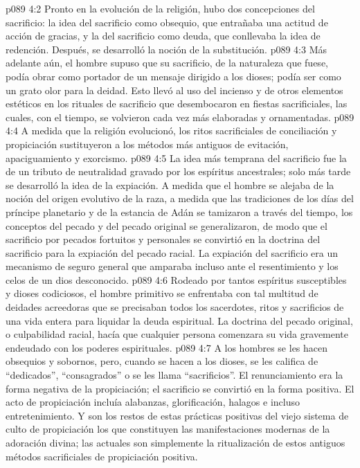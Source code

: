 \vs p089 4:2 Pronto en la evolución de la religión, hubo dos concepciones del sacrificio: la idea del sacrificio como obsequio, que entrañaba una actitud de acción de gracias, y la del sacrificio como deuda, que conllevaba la idea de redención. Después, se desarrolló la noción de la substitución.
\vs p089 4:3 Más adelante aún, el hombre supuso que su sacrificio, de la naturaleza que fuese, podía obrar como portador de un mensaje dirigido a los dioses; podía ser como un grato olor para la deidad. Esto llevó al uso del incienso y de otros elementos estéticos en los rituales de sacrificio que desembocaron en fiestas sacrificiales, las cuales, con el tiempo, se volvieron cada vez más elaboradas y ornamentadas.
\vs p089 4:4 \pc A medida que la religión evolucionó, los ritos sacrificiales de conciliación y propiciación sustituyeron a los métodos más antiguos de evitación, apaciguamiento y exorcismo.
\vs p089 4:5 La idea más temprana del sacrificio fue la de un tributo de neutralidad gravado por los espíritus ancestrales; solo más tarde se desarrolló la idea de la expiación. A medida que el hombre se alejaba de la noción del origen evolutivo de la raza, a medida que las tradiciones de los días del príncipe planetario y de la estancia de Adán se tamizaron a través del tiempo, los conceptos del pecado y del pecado original se generalizaron, de modo que el sacrificio por pecados fortuitos y personales se convirtió en la doctrina del sacrificio para la expiación del pecado racial. La expiación del sacrificio era un mecanismo de seguro general que amparaba incluso ante el resentimiento y los celos de un dios desconocido.
\vs p089 4:6 Rodeado por tantos espíritus susceptibles y dioses codiciosos, el hombre primitivo se enfrentaba con tal multitud de deidades acreedoras que se precisaban todos los sacerdotes, ritos y sacrificios de una vida entera para liquidar la deuda espiritual. La doctrina del pecado original, o culpabilidad racial, hacía que cualquier persona comenzara su vida gravemente endeudado con los poderes espirituales.
\vs p089 4:7 \pc A los hombres se les hacen obsequios y sobornos, pero, cuando se hacen a los dioses, se les califica de “dedicados”, “consagrados” o se les llama “sacrificios”. El renunciamiento era la forma negativa de la propiciación; el sacrificio se convirtió en la forma positiva. El acto de propiciación incluía alabanzas, glorificación, halagos e incluso entretenimiento. Y son los restos de estas prácticas positivas del viejo sistema de culto de propiciación los que constituyen las manifestaciones modernas de la adoración divina; las actuales son simplemente la ritualización de estos antiguos métodos sacrificiales de propiciación positiva.
